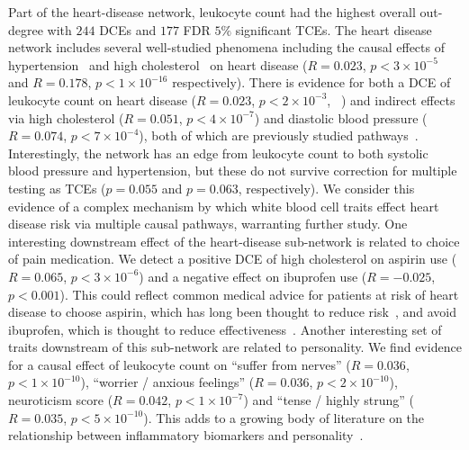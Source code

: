 \documentclass{article}
\begin{document}
Part of the heart-disease network, leukocyte count had the highest overall out-degree with $244$ DCEs
and $177$ FDR $5\%$ significant TCEs. The heart disease network includes several well-studied phenomena
including the causal effects of hypertension~\cite{MacMahon1990} and high cholesterol~\cite{Castelli1992}
on heart disease ($R=0.023$, $p < 3 \times 10^{-5}$ and $R=0.178$, $p < 1 \times 10^{-16}$ respectively).
 There is  evidence for both a DCE of leukocyte count on heart disease
($R=0.023$, $p < 2 \times 10^{-3}$, ~\cite{Lee2001})
and indirect effects via high cholesterol ($R=0.051$, $p < 4 \times 10^{-7}$) and diastolic blood pressure
($R=0.074$, $p < 7 \times 10^{-4}$), both of which are previously studied pathways~\cite{Facchini1992}.
Interestingly, the network has an edge from
leukocyte count to both systolic blood pressure and hypertension, but these do not survive correction
for multiple testing as TCEs ($p = 0.055$ and $p = 0.063$, respectively). We consider this evidence of
a complex mechanism by which white blood cell traits effect heart disease risk via multiple causal pathways,
warranting further study. One interesting downstream effect of the heart-disease sub-network is related
to choice of pain medication. We detect a positive DCE of high cholesterol on aspirin use
($R = 0.065$, $p < 3 \times 10^{-6}$) and a negative effect on ibuprofen use ($R = -0.025$, $p < 0.001$).
This could reflect common medical advice for patients at risk of heart disease to choose aspirin,
which has long been thought to reduce risk~\cite{Sanmuganathan2001}, and avoid ibuprofen, which
is thought to reduce effectiveness~\cite{MacDonald2006}. Another interesting set of traits
downstream of this sub-network are related to personality. We find evidence for a causal effect of
leukocyte count on ``suffer from nerves'' ($R=0.036$, $p < 1 \times 10^{-10}$), ``worrier / anxious feelings'' 
($R=0.036$, $p < 2 \times 10^{-10}$), neuroticism score ($R=0.042$, $p < 1 \times 10^{-7}$)
and ``tense / highly strung'' ($R = 0.035$, $p < 5 \times 10^{-10}$).
This adds to a growing body of literature on the relationship between
inflammatory biomarkers and personality~\cite{Allen2017,Sutin2012}.
\end{document}

